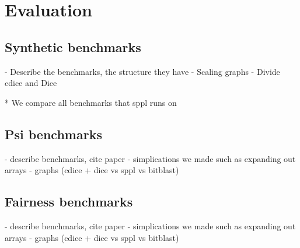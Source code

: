\section{Evaluation}\label{sec:evaluation}


\subsection{Synthetic benchmarks}\label{sec:synthetic-benchmarks}
- Describe the benchmarks, the structure they have
- Scaling graphs
- Divide cdice and Dice

* We compare all benchmarks that sppl runs on
\subsection{Psi benchmarks}\label{sec:psi-benchmarks}
- describe benchmarks, cite paper
- simplications we made such as expanding out arrays
- graphs (cdice + dice vs sppl vs bitblast)

\subsection{Fairness benchmarks}\label{sec:fairness-benchmarks}
- describe benchmarks, cite paper
- simplications we made such as expanding out arrays
- graphs (cdice + dice vs sppl vs bitblast)
